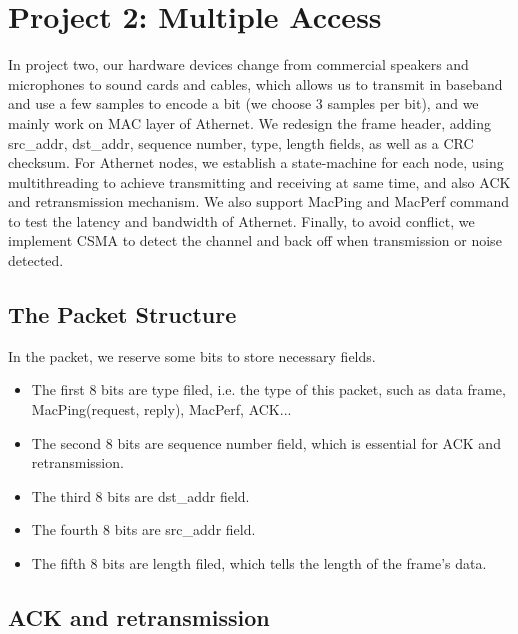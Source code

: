 \documentclass[11pt, conference]{IEEEtran}
\begin{document}
\section{Project 2: Multiple Access}

In project two, our hardware devices change from commercial speakers and microphones to sound cards and cables, which allows us to transmit in baseband and use a few samples to 
encode a bit (we choose 3 samples per bit), and we mainly work on MAC layer of Athernet. We redesign the frame header, adding src\_addr, dst\_addr, sequence number, type, length fields,
as well as a CRC checksum. For Athernet nodes, we establish a state-machine for each node, using multithreading to achieve transmitting and receiving at same time, and also ACK and retransmission
mechanism. We also support MacPing and MacPerf command to test the latency and bandwidth of Athernet. Finally, to avoid conflict, we implement CSMA to detect the channel and back off when transmission or noise detected.

\subsection{The Packet Structure}

In the packet, we reserve some bits to store necessary fields.
\begin{itemize}
\item The first 8 bits are type filed, i.e. the type of this packet, such as data frame, MacPing(request, reply), MacPerf, ACK...
\item The second 8 bits are sequence number field, which is essential for ACK and retransmission.
\item The third 8 bits are dst\_addr field. 
\item The fourth 8 bits are src\_addr field.
\item The fifth 8 bits are length filed, which tells the length of the frame's data.
\end{itemize}

\subsection{ACK and retransmission}
\end{document}
